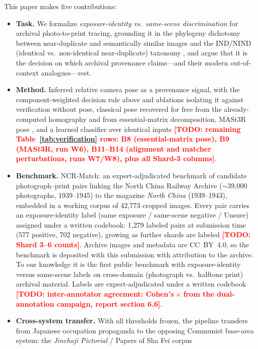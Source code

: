 \documentclass[letterpaper]{article} %
\newcommand{\todo}[1]{\textcolor{red}{\textbf{[TODO: #1]}}}
\begin{document}
\noindent This paper makes five contributions:
\begin{itemize}
\item \textbf{Task.} We formalize \emph{exposure-identity vs.\ same-scene
  discrimination} for archival photo-to-print tracing, grounding it in the
  phylogeny dichotomy between near-duplicate and semantically similar images
  \cite{dias2013forests} and the IND/NIND (identical vs.\ non-identical
  near-duplicate) taxonomy
  \cite{chum2007scalable,jindaapiraksa2013california}, and argue that it is
  the decision on which archival provenance claims---and their modern
  out-of-context analogues---rest.
\item \textbf{Method.} Inferred relative camera pose as a provenance signal,
  with the component-weighted decision rule above and ablations isolating it
  against verification without pose, classical pose recovered for free from
  the already-computed homography and from essential-matrix decomposition,
  MASt3R pose \cite{leroy2024mast3r}, and a learned classifier over identical
  inputs \todo{remaining Table~\ref{tab:verification} rows: B8
  (essential-matrix pose), B9 (MASt3R, run W6), B11--B14 (alignment and
  matcher perturbations, runs W7/W8), plus all Shard-3 columns}.
\item \textbf{Benchmark.} NCR-Match: an expert-adjudicated benchmark of
  candidate photograph--print pairs linking the North China Railway Archive
  ($\sim$39{,}000 photographs, 1939--1945) to the magazine \emph{North China}
  (1939--1943), embedded in a working corpus of 42{,}773 cropped images.
  Every pair carries an exposure-identity label (same exposure / same-scene
  negative / Unsure) assigned under a written codebook: 1{,}279 labeled
  pairs at submission time (577 positive, 702 negative), growing as further
  shards are labeled \todo{Shard 3--6 counts}. Archive images and
  metadata are CC~BY~4.0, so the benchmark is deposited with this submission
  with attribution to the archive. To our knowledge it is the first public
  benchmark with exposure-identity versus same-scene labels on cross-domain
  (photograph vs.\ halftone print) archival material. Labels are
  expert-adjudicated under a written codebook \todo{inter-annotator agreement:
  Cohen's $\kappa$ from the dual-annotation campaign, report section 6.6}.
\item \textbf{Cross-system transfer.} With all thresholds frozen, the pipeline
  transfers from Japanese occupation propaganda to the opposing Communist
  base-area system: the \emph{Jinchaji Pictorial} / Papers of Sha Fei corpus

\end{itemize}
\end{document}
